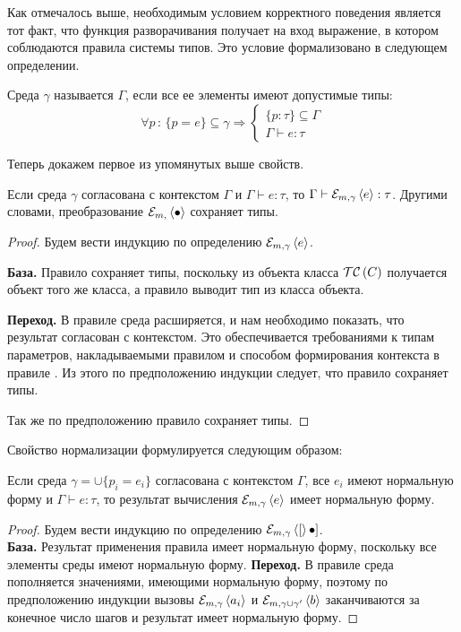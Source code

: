 {Как отмечалось выше, необходимым условием корректного поведения является тот факт, что функция разворачивания получает на вход выражение, в котором соблюдаются правила системы типов. Это условие формализовано в следующем определении.

\begin{Def}\label{agree}
Среда $\gamma$ называется  $\Gamma$, если все ее элементы имеют допустимые типы:
$$
	\forall p \, : \, 
		\{p = e\} \subseteq \gamma 
			\Rightarrow 
		\left\{\begin{array}{l}		
		\{p : \tau\} \subseteq \Gamma \\
		\Gamma \vdash e : \tau
		\end{array}\right.
$$
\end{Def}

Теперь докажем первое из упомянутых выше свойств.

\begin{Th}\label{ThTP}
Если среда $\gamma$ согласована с контекстом $\Gamma$ и \mbox{$\Gamma \vdash e : \tau$}, то \mbox{$\Gamma \vdash \mathcal{E}_{m, \gamma} \left\langle e \right\rangle : \tau$}. Другими словами, преобразование $\mathcal{E}_{m, } \left\langle \bullet \right\rangle$ сохраняет типы.
\end{Th}
\begin{proof}
Будем вести индукцию по определению $\mathcal{E}_{m, \gamma} \left\langle e \right\rangle$.

\noindent\textbf{База.} Правило  сохраняет типы, поскольку из объекта класса $\mathcal{TC}\left(C\right)$ получается объект того же класса, а правило  выводит тип из класса объекта.

\noindent\textbf{Переход.} 
В правиле  среда расширяется, и нам необходимо показать, что результат согласован с контекстом. Это обеспечивается требованиями к типам параметров, накладываемыми правилом  и способом формирования контекста в правиле . Из этого по предположению индукции следует, что правило  сохраняет типы.

Так же по предположению правило  сохраняет типы.
\end{proof}

Свойство нормализации формулируется следующим образом:

\begin{Th}[О нормализации]\label{ThNorm}
Если среда $\gamma = \cup \{p_i = e_i\}$ согласована с контекстом $\Gamma$, все $e_i$ имеют нормальную форму и $\Gamma \vdash e : \tau$, то результат вычисления $\mathcal{E}_{m, \gamma} \left\langle e \right\rangle$ имеет нормальную форму.
\end{Th}
\begin{proof} 
Будем вести индукцию по определению $\mathcal{E}_{m, \gamma} \left\langle [ \right\rangle\bullet]$.\\
\textbf{База.} Результат применения правила  имеет нормальную форму, поскольку все элементы среды имеют нормальную форму.
\textbf{Переход.} В правиле  среда пополняется значениями, имеющими нормальную форму, поэтому по предположению индукции вызовы $\mathcal{E}_{m, \gamma} \left\langle a_i \right\rangle$ и $\mathcal{E}_{m, \gamma \cup \gamma'} \left\langle b \right\rangle$ заканчиваются за конечное число шагов и результат имеет нормальную форму.


\end{proof}}
